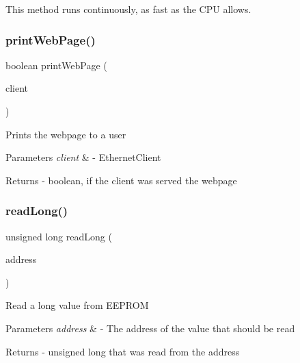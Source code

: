 This method runs continuously, as fast as the C\+PU allows. \mbox{\label{test_8ino_a4bc21f1d5c931a2590a7cd760368cb78}} 
\subsubsection{\texorpdfstring{printWebPage()}{printWebPage()}}
{\footnotesize\ttfamily boolean print\+Web\+Page (\begin{DoxyParamCaption}\item[{Ethernet\+Client}]{client }\end{DoxyParamCaption})}

Prints the webpage to a user 
\begin{DoxyParams}{Parameters}
{\em client} & -\/ Ethernet\+Client \\
\hline
\end{DoxyParams}
\begin{DoxyReturn}{Returns}
-\/ boolean, if the client was served the webpage 
\end{DoxyReturn}
\mbox{\label{test_8ino_a9481ce48d8cc7194d54460345fdc4a1e}} 
\subsubsection{\texorpdfstring{readLong()}{readLong()}}
{\footnotesize\ttfamily unsigned long read\+Long (\begin{DoxyParamCaption}\item[{int}]{address }\end{DoxyParamCaption})}

Read a long value from E\+E\+P\+R\+OM 
\begin{DoxyParams}{Parameters}
{\em address} & -\/ The address of the value that should be read \\
\hline
\end{DoxyParams}
\begin{DoxyReturn}{Returns}
-\/ unsigned long that was read from the address 
\end{DoxyReturn}
\mbox{\label{test_8ino_a4e8d23e3997d5440e6baf9cb26bd0e03}} 

